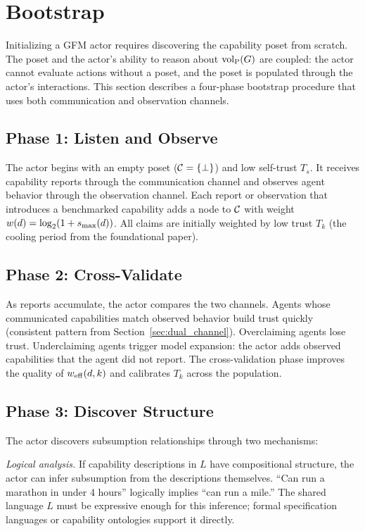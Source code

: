 \section{Bootstrap}
\label{sec:bootstrap}

Initializing a GFM actor requires discovering the capability poset from
scratch. The poset and the actor's ability to reason about ${\operatorname{vol}_{\mathrm{P}}}(G)$ are
coupled: the actor cannot evaluate actions without a poset, and the poset
is populated through the actor's interactions. This section describes a
four-phase bootstrap procedure that uses both communication and observation
channels.

\subsection{Phase 1: Listen and Observe}

The actor begins with an empty poset ($\mathcal{C} = \{\bot\}$) and low self-trust
$T_s$. It receives capability reports through the communication channel and
observes agent behavior through the observation channel. Each report or
observation that introduces a benchmarked capability adds a node to $\mathcal{C}$ with
weight $w(d) = \log_2(1 + s_{\mathrm{max}}(d))$. All claims are initially weighted by
low trust $T_k$ (the cooling period from the foundational paper).

\subsection{Phase 2: Cross-Validate}

As reports accumulate, the actor compares the two channels. Agents whose
communicated capabilities match observed behavior build trust quickly
(consistent pattern from Section~\ref{sec:dual_channel}). Overclaiming agents
lose trust. Underclaiming agents trigger model expansion: the actor adds
observed capabilities that the agent did not report. The cross-validation phase
improves the quality of $w_{\mathrm{eff}}(d, k)$ and calibrates $T_k$ across the
population.

\subsection{Phase 3: Discover Structure}

The actor discovers subsumption relationships through two mechanisms:

\emph{Logical analysis.} If capability descriptions in $L$ have compositional
structure, the actor can infer subsumption from the descriptions themselves.
``Can run a marathon in under 4 hours'' logically implies ``can run a mile.''
The shared language $L$ must be expressive enough for this inference; formal
specification languages or capability ontologies support it directly.

